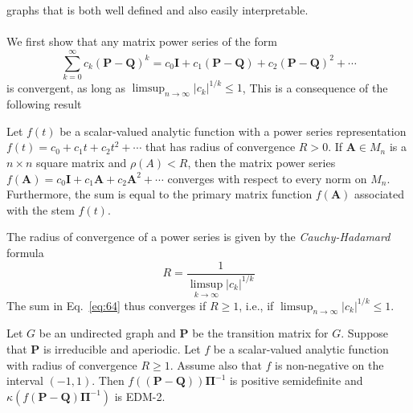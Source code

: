 graphs that is both well defined and also easily interpretable. \\ \\
\noindent
We first show that any matrix power series of the form
\begin{equation}
  \label{eq:64}
  \sum_{k=0}^{\infty}{c_k (\mathbf{P} - \mathbf{Q})^{k}} = 
c_0\mathbf{I} + c_1(\mathbf{P} - \mathbf{Q}) + c_2(\mathbf{P} -
  \mathbf{Q})^{2} + \cdots
\end{equation}
is convergent, as long as $\limsup_{n \rightarrow \infty} |c_k|^{1/k}
\leq 1$, This is a consequence of the following result \citep[\S
6.2]{horn94:_topic_in_matrix_analy}
\begin{theorem}
  \label{thm:3}
  Let $f(t)$ be a scalar-valued analytic function with a power series
  representation $f(t) = c_0 + c_1t + c_2 t^2 + \cdots$ that has radius
  of convergence $R > 0$. If $\mathbf{A} \in M_n$ is a $n \times n$
  square matrix and $\rho(A) < R$, then the matrix power series
  $f(\mathbf{A}) = c_0 \mathbf{I} + c_1 \mathbf{A} + c_2 \mathbf{A}^2
  + \cdots$ converges with respect to every norm on $M_n$. Furthermore,
  the sum is equal to the primary matrix function $f(\mathbf{A})$
  associated with the stem $f(t)$.
\end{theorem}
The radius of convergence of a power series is given by the {\em
  Cauchy-Hadamard} \/ formula \citep[\S V.3]{gamelin01:_compl_analy}
\begin{equation}
  \label{eq:65}
  R = \frac{1}{\limsup_{k \rightarrow \infty}{|c_k|^{1/k}}}
\end{equation}
The sum in Eq.~\eqref{eq:64} thus converges if $R \geq 1$, i.e.,
if $\limsup_{n \rightarrow \infty} |c_k|^{1/k} \leq 1$. 
\begin{proposition}
  \label{prop:13}
  Let $G$ be an undirected graph and $\mathbf{P}$ be the transition
  matrix for $G$. Suppose that $\mathbf{P}$ is irreducible and
  aperiodic.  Let $f$ be a scalar-valued analytic function with radius
  of convergence $R \geq 1$. Assume also that $f$ is non-negative on
  the interval $(-1,1)$. Then $f((\mathbf{P} -
  \mathbf{Q}))\bm{\Pi}^{-1}$ is positive semidefinite
  and $\kappa(f(\mathbf{P} - \mathbf{Q})\bm{\Pi}^{-1})$ is 
  EDM-2.
\end{proposition}
